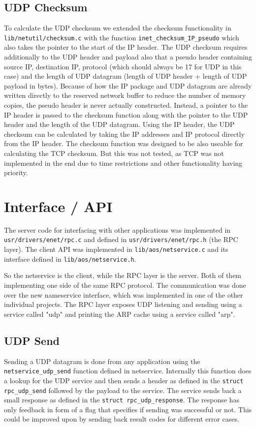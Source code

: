 \subsection{UDP Checksum}
To calculate the UDP checksum we extended the checksum functionality in \verb|lib/netutil/checksum.c| with the function \verb|inet_checksum_IP_pseudo| which also takes the pointer to the start of the IP header. The UDP checksum requires additionally to the UDP header and payload also that a pseudo header containing source IP, destination IP, protocol (which should always be 17 for UDP in this case) and the length of UDP datagram (length of UDP header + length of UDP payload in bytes).
Because of how the IP package and UDP datagram are already written directly to the reserved network buffer to reduce the number of memory copies, the pseudo header is never actually constructed. Instead, a pointer to the IP header is passed to the checksum function along with the pointer to the UDP header and the length of the UDP datagram. Using the IP header, the UDP checksum can be calculated by taking the IP addresses and IP protocol directly from the IP header.
The checksum function was designed to be also useable for calculating the TCP checksum. But this was not tested, as TCP was not implemented in the end due to time restrictions and other functionality having priority.

\section{Interface / API}
The server code for interfacing with other applications was implemented in \verb|usr/drivers/enet/rpc.c| and defined in \verb|usr/drivers/enet/rpc.h| (the RPC layer). The client API was implemented in \verb|lib/aos/netservice.c| and its interface defined in \verb|lib/aos/netservice.h|.

So the netservice is the client, while the RPC layer is the server. Both of them implementing one side of the same RPC protocol. The communication was done over the new nameservice interface, which was implemented in one of the other individual projects. The RPC layer exposes UDP listening and sending using a service called "udp" and printing the ARP cache using a service called "arp".

\subsection{UDP Send}
Sending a UDP datagram is done from any application using the \verb|netservice_udp_send| function defined in netservice. Internally this function does a lookup for the UDP service and then sends a header as defined in the \verb|struct rpc_udp_send| followed by the payload to the service. The service sends back a small response as defined in the \verb|struct rpc_udp_response|.
The response has only feedback in form of a flag that specifies if sending was successful or not. This could be improved upon by sending back result codes for different error cases.

